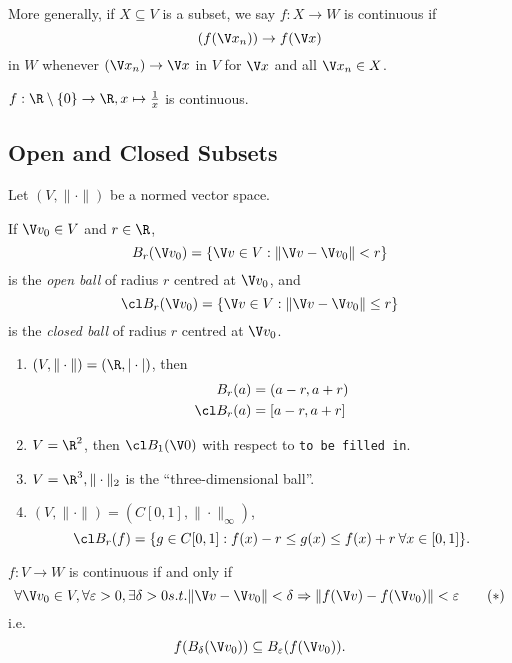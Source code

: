 \documentclass[a4paper]{article}
\theoremstyle{definition}
\begin{document}
More generally, if $X\subseteq V$ is a subset, we say $f:X\to W$ is continuous if
\[
  (f(\V x_n)) \to f(\V x)
\]
in $W$ whenever $(\V x_n) \to \V x$ in $V$ for $\V x$ and all $\V x_n \in X$.

\begin{eg}
  $f:\R \setminus \{0\} \to \R, x \mapsto \frac{1}{x}$ is continuous.
\end{eg}

\subsection{Open and Closed Subsets}

Let $(V, \|\cdot\|)$ be a normed vector space.

\begin{definition}
  If $\V v_0 \in V$ and $r \in \R$,
  \[
    B_r(\V v_0) = \{\V v\in V: \|\V v - \V v_0\| < r \}
  \]
  is the \emph{open ball} of radius $r$ centred at $\V v_0$, and
  \[
    \cl B_r(\V v_0) = \{\V v\in V: \|\V v - \V v_0\| \leq r \}
  \]
  is the \emph{closed ball} of radius $r$ centred at $\V v_0$.
\end{definition}

\begin{eg}\leavevmode
  \begin{enumerate}
  \item $(V, \|\cdot\|) = (\R, |\cdot|)$, then
    \begin{align*}
      B_r(a) &= (a-r, a+r) \\
      \cl B_r(a) &= [a-r, a+r] 
    \end{align*}
  \item $V=\R^2$, then $\cl B_1(\V 0)$ with respect to \texttt{to be filled in}.
\item $V = \R^3, \|\cdot\|_2$ is the ``three-dimensional ball''.
\item $(V, \|\cdot\|) = (C[0,1], \|\cdot\|_\infty)$,
  \[
    \cl B_r(f) = \{g\in C[0,1]: f(x)-r \leq g(x) \leq f(x) + r \: \forall x \in [0,1]\}.
  \]
  \end{enumerate}
\end{eg}

\begin{proposition}
  $f:V\to W$ is continuous if and only if
  \begin{equation}
    \label{eqn:alternate continuity}
    \forall \V v_0 \in V, \forall \varepsilon>0, \exists \delta>0 s.t. \|\V v- \V v_0\| < \delta \Rightarrow \|f(\V v) - f(\V v_0)\| < \varepsilon
    \tag{$\ast$}
    \end{equation}
  i.e.\ 
  \[
    f(B_\delta(\V v_0)) \subseteq B_\varepsilon(f(\V v_0)).
    \]
\end{proposition}
\end{document}
